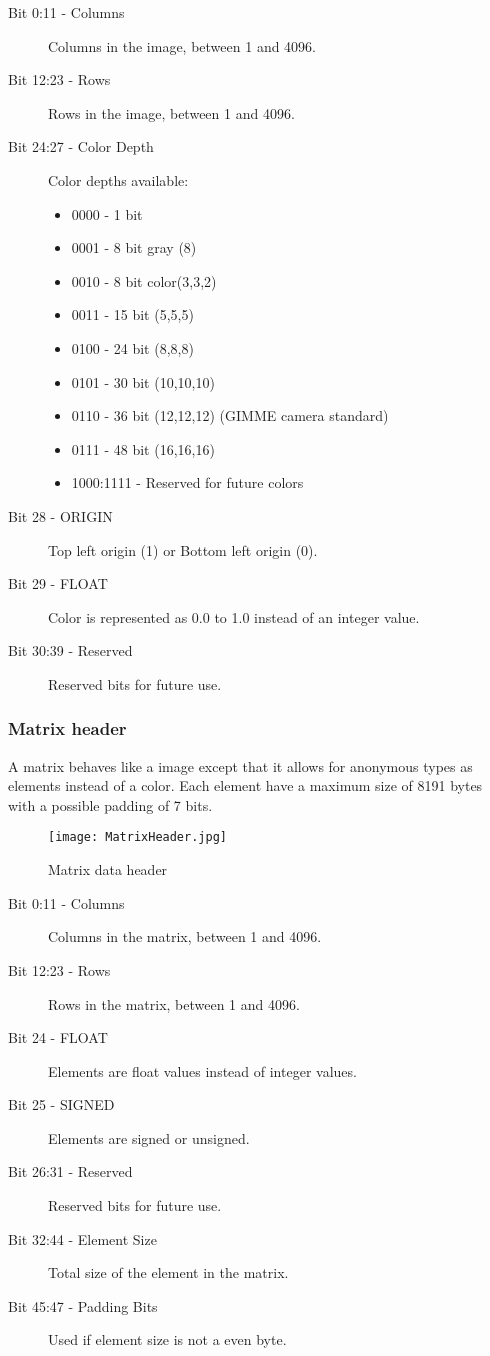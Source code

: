 \begin{description}
\item [Bit 0:11 - Columns] Columns in the image, between 1 and 4096.
\item [Bit 12:23 - Rows] Rows in the image, between 1 and 4096.
\item [Bit 24:27 - Color Depth] Color depths available:
	\begin{itemize}
	\item 0000 - 1 bit
	\item 0001 - 8 bit gray (8)
	\item 0010 - 8 bit color(3,3,2)
	\item 0011 - 15 bit (5,5,5)
	\item 0100 - 24 bit (8,8,8)
	\item 0101 - 30 bit (10,10,10)
	\item 0110 - 36 bit (12,12,12) (GIMME camera standard)
	\item 0111 - 48 bit (16,16,16)
	\item 1000:1111 - Reserved for future colors
	\end{itemize}
\item [Bit 28 - ORIGIN] Top left origin (1) or Bottom left origin (0).
\item [Bit 29 - FLOAT] Color is represented as 0.0 to 1.0 instead of an integer value.
\item [Bit 30:39 - Reserved] Reserved bits for future use.
\end{description}

\subsubsection*{Matrix header}
A matrix behaves like a image except that it allows for anonymous types as elements instead of a color. Each element have a maximum size of 8191 bytes with a possible padding of 7 bits. 

\begin{figure}
\centering
\texttt{[image: MatrixHeader.jpg]}
\caption{Matrix data header}
\label{fig:MatrixHeader}
\end{figure}

\begin{description}
\item [Bit 0:11 - Columns] Columns in the matrix, between 1 and 4096.
\item [Bit 12:23 - Rows] Rows in the matrix, between 1 and 4096.
\item [Bit 24 - FLOAT] Elements are float values instead of integer values.
\item [Bit 25 - SIGNED] Elements are signed or unsigned.
\item [Bit 26:31 - Reserved] Reserved bits for future use.
\item [Bit 32:44 - Element Size] Total size of the element in the matrix.
\item [Bit 45:47 - Padding Bits] Used if element size is not a even byte.
\end{description}

